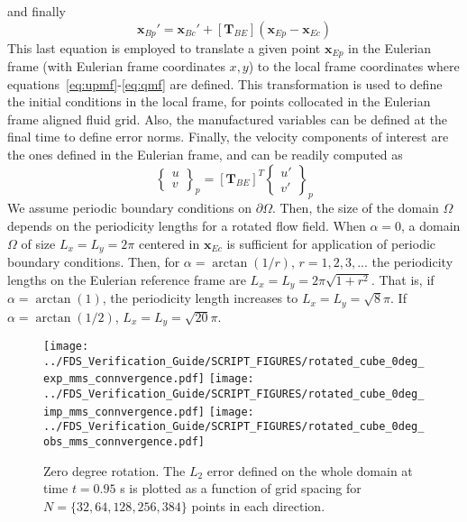 \documentclass[12pt]{article}
\begin{document}
%
and finally
%
\begin{equation}
    \mathbf{x}_{Bp}'= \mathbf{x}_{Bc}' +[\mathbf{T}_{BE}] \left( \mathbf{x}_{Ep} - \mathbf{x}_{Ec} \right)
\end{equation}
%
This last equation is employed to translate a given point $\mathbf{x}_{Ep}$ in the Eulerian frame (with Eulerian frame coordinates $x,y$) to the local frame coordinates where equations~\eqref{eq:upmf}-\eqref{eq:qmf} are defined. This transformation is used to define the initial conditions in the local frame, for points collocated in the Eulerian frame aligned fluid grid. Also, the manufactured variables can be defined at the final time to define error norms. Finally, the velocity components of interest are the ones defined in the Eulerian frame, and can be readily computed as
%
\begin{equation}
  \left\{ \begin{array}{c}  u \\ v \end{array} \right\}_p = [\mathbf{T}_{BE}]^T \left\{ \begin{array}{c}  u' \\ v' \end{array} \right\}_p
\end{equation}
%
We assume periodic boundary conditions on $\partial \Omega$. Then, the size of the domain $\Omega$ depends on the periodicity lengths for a rotated flow field.
When $\alpha=0$, a domain $\Omega$ of size $L_x=L_y=2\pi$ centered in $\mathbf{x}_{Ec}$ is sufficient for application of periodic boundary conditions. Then, for $\alpha=\arctan(1/r)$, $r=1,2,3,...$ the periodicity lengths on the Eulerian reference frame are $L_x=L_y=2\pi \sqrt{1+r^2}$.
That is, if $\alpha=\arctan(1)$,  the periodicity length increases to $L_x=L_y=\sqrt{8} \pi$. If $\alpha=\arctan(1/2)$, $L_x=L_y=\sqrt{20} \pi$.



\begin{figure}[ht]
\centering
\texttt{[image: ../FDS\_Verification\_Guide/SCRIPT\_FIGURES/rotated\_cube\_0deg\_exp\_mms\_connvergence.pdf]}
\texttt{[image: ../FDS\_Verification\_Guide/SCRIPT\_FIGURES/rotated\_cube\_0deg\_imp\_mms\_connvergence.pdf]}
\texttt{[image: ../FDS\_Verification\_Guide/SCRIPT\_FIGURES/rotated\_cube\_0deg\_obs\_mms\_connvergence.pdf]}
\caption[The {\ct Rotated Cube CC} accuracy order test case]{Zero degree rotation. The $L_2$ error defined on the whole domain at time $t = 0.95$ s is plotted as a function of grid spacing for $N=\{32,64,128,256,384\}$ points in each direction.}\label{fig:rotcube_cc_0deg_accuracy_order}
\end{figure}
\end{document}
